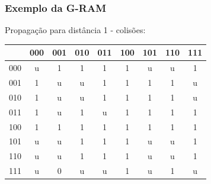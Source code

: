 \documentclass{beamer}
\begin{document}
\begin{frame}
    \frametitle{Exemplo da G-RAM}
    Propagação para distância 1 - colisões:

    \begin{table}
        \centering
        \begin{tabular}{|c|c|c|c|c|c|c|c|c|}
            \hline
                &       000 &       001 &       010 &       011 &       100 &       101 &       110 &       111\\
            \hline
            000 &        u  &        1  &        1  &        1  &        1  &        u  &        u  &        1 \\
            \hline
            001 &        1  &        u  &        u  &        1  &        1  &        1  &        1  &        u \\
            \hline
            010 &        1  &        u  &        u  &        1  &        1  &        1  &        1  &        u \\
            \hline
            011 &        1  & \alert u  &        1  &        u  &        1  &        1  &        1  &        1 \\
            \hline
            100 &        1  &        1  &        1  &        1  &        1  &        1  &        1  &        1 \\
            \hline
            101 &        u  & \alert u  &        1  &        1  &        1  &        u  &        u  &        1 \\
            \hline
            110 &        u  & \alert u  &        1  &        1  &        1  &        u  &        u  &        1 \\
            \hline
            111 & \alert u  &        0  &        u  & \alert u  &        1  & \alert u  &        1  &        u \\
            \hline

        \end{tabular}
    \end{table}
\end{frame}
\end{document}
